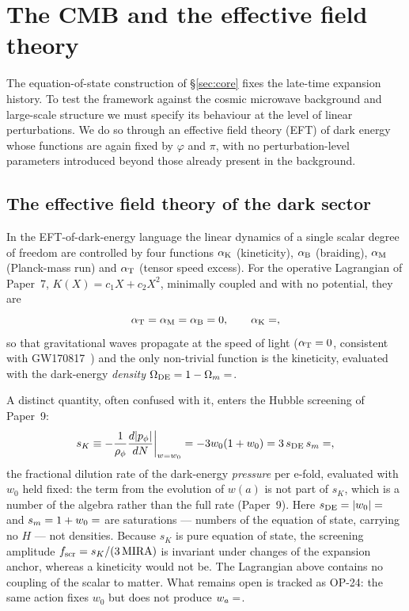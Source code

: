 \documentclass[a4paper,11pt]{article}
\begin{document}
\section{The CMB and the effective field theory}
\label{sec:eft}

The equation-of-state construction of \S\ref{sec:core} fixes the
late-time expansion history. To test the framework against the cosmic
microwave background and large-scale structure we must specify its behaviour
at the level of linear perturbations. We do so through an effective field
theory (EFT) of dark energy whose functions are again fixed by $\varphi$ and
$\pi$, with no perturbation-level parameters introduced beyond those already
present in the background.

\subsection{The effective field theory of the dark sector}
\label{sec:eft-functions}
In the EFT-of-dark-energy language \citep{Cheung2008,Gubitosi2013,Bellini2014} the linear
dynamics of a single scalar degree of freedom are controlled by four
functions $\alpha_{\rm K}$ (kineticity), $\alpha_{\rm B}$ (braiding),
$\alpha_{\rm M}$ (Planck-mass run) and $\alpha_{\rm T}$ (tensor speed excess).
For the operative Lagrangian of Paper~7, $K(X)=c_1X+c_2X^2$, minimally coupled
and with no potential, they are
\begin{equation}
  \label{eq:eft-alphas}
  \alpha_{\rm T}=\alpha_{\rm M}=\alpha_{\rm B}=0,
  \qquad
  \alpha_{\rm K}=\val{alpha_K_z0_d6} ,
\end{equation}
so that gravitational waves propagate at the speed of light
($\alpha_{\rm T}=0$, consistent with GW170817~\citep{GW170817}) and the only
non-trivial function is the kineticity, evaluated with the dark-energy
\emph{density} $\Omega_{\rm DE}=1-\Omega_m=\val{OMDE_DENS_d6}$.

A distinct quantity, often confused with it, enters the Hubble screening of
Paper~9:
%
\begin{equation}
  s_K \equiv -\frac{1}{\rho_\phi}\frac{d|p_\phi|}{dN}\bigg|_{w=w_0} = -3w_0(1+w_0)
      = 3\,s_{\rm DE}\,s_m = \val{S_K_d6} ,
  \label{eq:sK_sealed}
\end{equation}
%
the fractional dilution rate of the dark-energy \emph{pressure} per e-fold,
evaluated with $w_0$ held fixed: the term from the evolution of $w(a)$ is not part
of $s_K$, which is a number of the algebra rather than the full rate (Paper~9).
Here $s_{\rm DE}=|w_0|=\val{S_DE_d6}$ and $s_m=1+w_0=\val{S_M_d6}$ are saturations ---
numbers of the equation of state, carrying no $H$ --- not densities. Because
$s_K$ is pure equation of state, the screening amplitude
$f_{\rm scr}=s_K/(3\,\mathrm{MIRA})$ is invariant under changes of the expansion
anchor, whereas a kineticity would not be. The Lagrangian above contains no
coupling of the scalar to matter. What remains open is tracked as OP-24: the
same action fixes $w_0$ but does not produce $w_a=\val{WA_d6}$.
\end{document}
